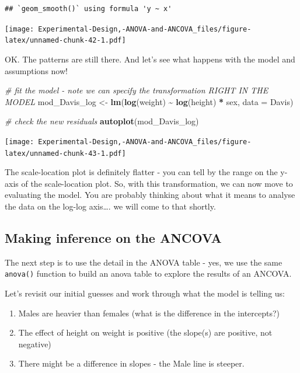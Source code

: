 \documentclass[
]{book}
\newenvironment{Shaded}{\begin{snugshade}}{\end{snugshade}}
\newcommand{\AttributeTok}[1]{\textcolor[rgb]{0.13,0.29,0.53}{#1}}
\newcommand{\CommentTok}[1]{\textcolor[rgb]{0.56,0.35,0.01}{\textit{#1}}}
\newcommand{\FunctionTok}[1]{\textcolor[rgb]{0.13,0.29,0.53}{\textbf{#1}}}
\newcommand{\NormalTok}[1]{#1}
\newcommand{\OtherTok}[1]{\textcolor[rgb]{0.56,0.35,0.01}{#1}}
\newcommand{\SpecialCharTok}[1]{\textcolor[rgb]{0.81,0.36,0.00}{\textbf{#1}}}
\providecommand{\tightlist}{%
  \setlength{\itemsep}{0pt}\setlength{\parskip}{0pt}}
\begin{document}
\begin{verbatim}
## `geom_smooth()` using formula 'y ~ x'
\end{verbatim}

\texttt{[image: Experimental-Design,-ANOVA-and-ANCOVA\_files/figure-latex/unnamed-chunk-42-1.pdf]}

OK. The patterns are still there. And let's see what happens with the model and assumptions now!

\begin{Shaded}
\begin{Highlighting}[]
\CommentTok{\# fit the model {-} note we can specify the transformation RIGHT IN THE MODEL}
\NormalTok{mod\_Davis\_log }\OtherTok{\textless{}{-}} \FunctionTok{lm}\NormalTok{(}\FunctionTok{log}\NormalTok{(weight) }\SpecialCharTok{\textasciitilde{}} \FunctionTok{log}\NormalTok{(height) }\SpecialCharTok{*}\NormalTok{ sex, }\AttributeTok{data =}\NormalTok{ Davis)}

\CommentTok{\# check the new residuals}
\FunctionTok{autoplot}\NormalTok{(mod\_Davis\_log)}
\end{Highlighting}
\end{Shaded}

\texttt{[image: Experimental-Design,-ANOVA-and-ANCOVA\_files/figure-latex/unnamed-chunk-43-1.pdf]}

The scale-location plot is definitely flatter - you can tell by the range on the y-axis of the scale-location plot. So, with this transformation, we can now move to evaluating the model. You are probably thinking about what it means to analyse the data on the log-log axis\ldots. we will come to that shortly.

\hypertarget{making-inference-on-the-ancova}{%
\subsection{Making inference on the ANCOVA}\label{making-inference-on-the-ancova}}

The next step is to use the detail in the ANOVA table - yes, we use the same \texttt{anova()} function to build an anova table to explore the results of an ANCOVA.

Let's revisit our initial guesses and work through what the model is telling us:

\begin{enumerate}
\def\labelenumi{\arabic{enumi}.}
\tightlist
\item
  Males are heavier than females (what is the difference in the intercepts?)
\item
  The effect of height on weight is positive (the slope(s) are positive, not negative)
\item
  There might be a difference in slopes - the Male line is steeper.
\end{enumerate}
\end{document}
